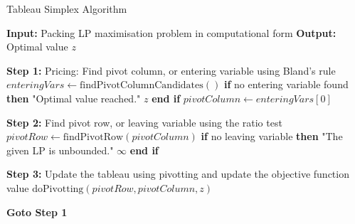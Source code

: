 \begin{algorithm}
    \caption{Tableau Simplex Algorithm}
    \begin{algorithmic}[1]
        \State \textbf{Input:} Packing LP maximisation problem in computational form
        \State \textbf{Output:} Optimal value $z$

        \State \textbf{Step 1:} Pricing: Find pivot column, or entering variable using Bland's rule
        \State \hspace{\algorithmicindent} $enteringVars \gets \text{findPivotColumnCandidates}()$
        \State \hspace{\algorithmicindent} \textbf{if} no entering variable found \textbf{then}
        \State \hspace{\algorithmicindent} \hspace{\algorithmicindent}  "Optimal value reached."
        \State \hspace{\algorithmicindent} \hspace{\algorithmicindent} \Return $z$
        \State \hspace{\algorithmicindent} \textbf{end if}
        \State \hspace{\algorithmicindent} $pivotColumn \gets enteringVars[0]$

        \State \textbf{Step 2:} Find pivot row, or leaving variable using the ratio test
        \State \hspace{\algorithmicindent} $pivotRow \gets \text{findPivotRow}(pivotColumn)$
        \State \hspace{\algorithmicindent} \textbf{if} no leaving variable \textbf{then}
        \State \hspace{\algorithmicindent} \hspace{\algorithmicindent}  "The given LP is unbounded."
        \State \hspace{\algorithmicindent} \hspace{\algorithmicindent} \Return $\infty$
        \State \hspace{\algorithmicindent} \textbf{end if}

        \State \textbf{Step 3:} Update the tableau using pivotting and update the objective function value
        \State \hspace{\algorithmicindent} $\text{doPivotting}(pivotRow, pivotColumn, z)$

        \State \textbf{Goto Step 1}
    \end{algorithmic}
\end{algorithm}

